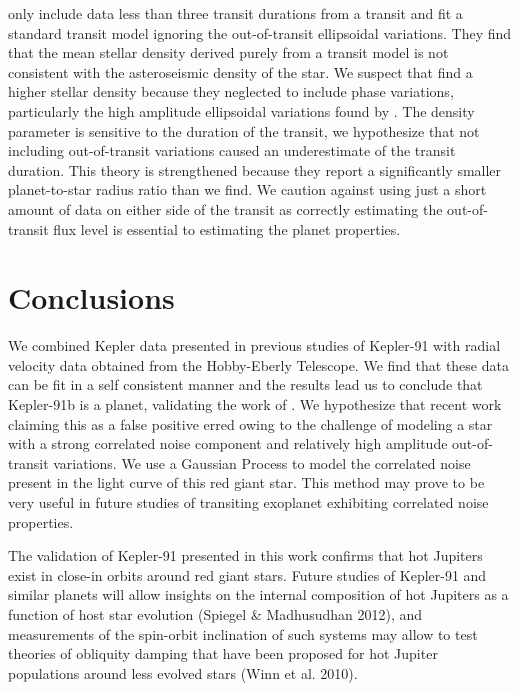 \documentclass[apjl]{emulateapj}
\begin{document}
\citet{sliski14} only include data less than three transit durations from a transit and fit a standard transit model ignoring the out-of-transit ellipsoidal variations. They find that the mean stellar density derived purely from a transit model is not consistent with the asteroseismic density of the star. We suspect that \citeauthor{sliski14} find a higher stellar density because they neglected to include phase variations, particularly the high amplitude ellipsoidal variations found by \citet{lillo14}. The density parameter is sensitive to the duration of the transit, we hypothesize that not including out-of-transit variations caused an underestimate of the transit duration. This theory is strengthened because they report a significantly smaller planet-to-star radius ratio than we find. We caution against using just a short amount of data on either side of the transit as correctly estimating the out-of-transit flux level is essential to estimating the planet properties.





\section{Conclusions}
We combined Kepler data presented in previous studies of Kepler-91 with radial velocity data obtained from the Hobby-Eberly Telescope. We find that these data can be fit in a self consistent manner and the results lead us to conclude that Kepler-91b is a planet, validating the work of \citet{lillo14}. We hypothesize that recent work claiming this as a false positive erred owing to the challenge of modeling a star with a strong correlated noise component and relatively high amplitude out-of-transit variations. We use a Gaussian Process to model the correlated noise present in the light curve of this red giant star. This method may prove to be very useful in future studies of transiting exoplanet exhibiting correlated noise properties.

The validation of Kepler-91 presented in this work confirms that hot Jupiters exist in close-in orbits around red giant stars. Future studies of Kepler-91 and similar planets will allow insights on the internal composition of hot Jupiters as a function of host star evolution (Spiegel & Madhusudhan 2012), and measurements of the spin-orbit inclination of such systems may allow to test theories of obliquity damping that have been proposed for hot Jupiter populations around less evolved stars (Winn et al. 2010).
\end{document}
